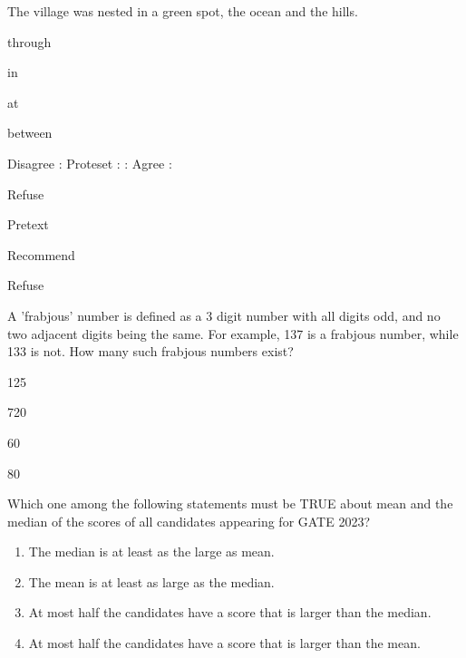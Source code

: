 \iffalse
\author{EE24BTECH11050}
\chapter{2023}
\section{xe}
\fi
\item %
The village was nested in a green spot, \underline{\hspace{2cm}} the ocean and the hills.
\begin{enumerate}
\begin{multicols}{4}
\item through
\item in
\item at 
\item between
\end{multicols}
\end{enumerate}
\item %
Disagree : Proteset : : Agree : \underline{\hspace{1.5cm}}
\begin{enumerate}
\begin{multicols}{4}
\item Refuse
\item Pretext
\item Recommend
\item Refuse
\end{multicols}
\end{enumerate}
\item %
A 'frabjous' number is defined as a 3 digit number with all digits odd, and no two adjacent digits being the same. For example, 137 is a frabjous number, while 133 is not. How many such frabjous numbers exist? 
\begin{enumerate}
\begin{multicols}{4}
\item 125
\item 720
\item 60
\item 80
\end{multicols}
\end{enumerate}
\item %
Which one among the following statements must be TRUE about mean and the median of the scores of all candidates appearing for GATE 2023?
\begin{enumerate}
\item The median is at least as the large as mean.
\item The mean is at least as large as the median.
\item At most half the candidates have a score that is larger than the median.
\item At most half the candidates have a score that is larger than the mean.
\end{enumerate}
